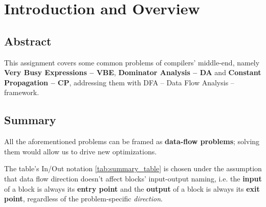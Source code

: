\documentclass[a4paper,12pt,numbers=noenddot]{scrreprt}
\begin{document}
\chapter*{Introduction and Overview}

    \section*{Abstract}
    
        This assignment covers some common problems of compilers' middle-end, namely \textbf{Very Busy Expressions -- VBE}, \textbf{Dominator Analysis -- DA} and \textbf{Constant Propagation -- CP}, addressing them with DFA -- Data Flow Analysis -- framework.
    
    \section*{Summary}
    
        All the aforementioned problems can be framed as \textbf{data-flow problems}; solving them would allow us to drive new optimizations.

        The table's In/Out notation \ref{tab:summary_table} is chosen under the assumption that data flow direction doesn't affect blocks' input-output naming, i.e. the \textbf{input} of a block is always its \textbf{entry point} and the \textbf{output} of a block is always its \textbf{exit point}, regardless of the problem-specific \textit{direction}.

        \vspace{1cm}
\end{document}
